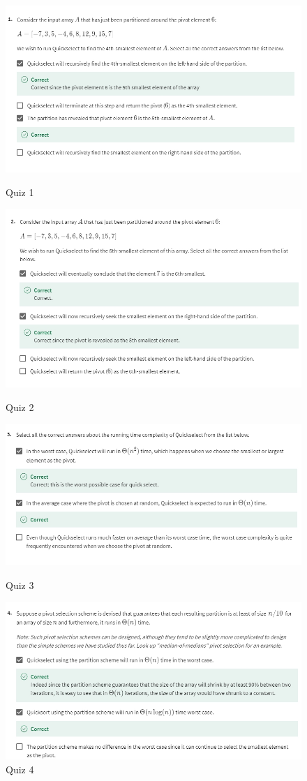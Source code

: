 \documentclass{article}
\begin{document}
\begin{figure}[H]
    \includegraphics[width=\textwidth]{quickselectquiz1.png}
    \caption{Quiz 1\\}
    \includegraphics[width=\textwidth]{quickselectquiz2.png}
    \caption{Quiz 2\\}
    \includegraphics[width=\textwidth]{quickselectquiz3.png}
    \caption{Quiz 3\\}
    \includegraphics[width=\textwidth]{quickselectquiz4.png}
    \caption{Quiz 4\\}
\end{figure}
\end{document}
